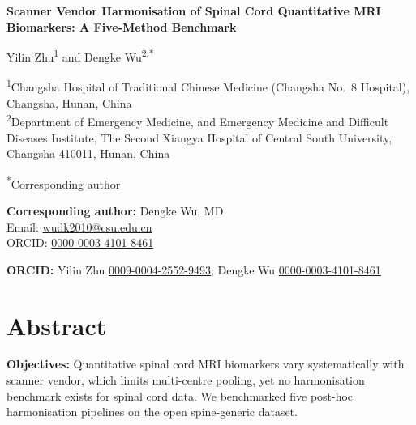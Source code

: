 \documentclass[12pt,a4paper]{article}
\begin{document}
\linenumbers

\begin{center}
{\LARGE\bfseries Scanner Vendor Harmonisation of Spinal Cord Quantitative MRI Biomarkers: A Five-Method Benchmark\par}
\vspace{8mm}

{\large Yilin Zhu\textsuperscript{1} and Dengke Wu\textsuperscript{2,*}\par}
\vspace{4mm}

\textsuperscript{1}Changsha Hospital of Traditional Chinese Medicine (Changsha No.\ 8 Hospital), Changsha, Hunan, China \\
\textsuperscript{2}Department of Emergency Medicine, and Emergency Medicine and Difficult Diseases Institute, The Second Xiangya Hospital of Central South University, Changsha 410011, Hunan, China
\vspace{3mm}

\textsuperscript{*}Corresponding author
\vspace{3mm}

\textbf{Corresponding author:} Dengke Wu, MD \\
Email: \href{mailto:wudk2010@csu.edu.cn}{wudk2010@csu.edu.cn} \\
ORCID: \href{https://orcid.org/0000-0003-4101-8461}{0000-0003-4101-8461}
\vspace{3mm}

\textbf{ORCID:} Yilin Zhu \href{https://orcid.org/0009-0004-2552-9493}{0009-0004-2552-9493}; Dengke Wu \href{https://orcid.org/0000-0003-4101-8461}{0000-0003-4101-8461}
\end{center}

\vspace{6mm}

\section*{Abstract}

\noindent\textbf{Objectives:} Quantitative spinal cord MRI biomarkers vary systematically with scanner vendor, which limits multi-centre pooling, yet no harmonisation benchmark exists for spinal cord data. We benchmarked five post-hoc harmonisation pipelines on the open spine-generic dataset.
\end{document}
